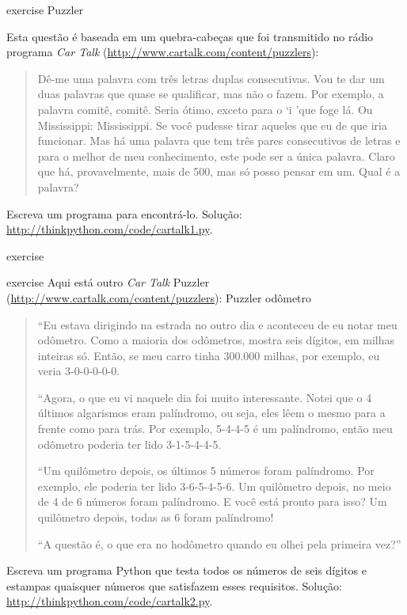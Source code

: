 \documentclass[10pt]{book}
\begin{document}
\begin{exercise}
\begin{} exercise
\index{} Puzzler

Esta questão é baseada em um quebra-cabeças que foi transmitido no rádio
programa {\em Car Talk} 
(\url{http://www.cartalk.com/content/puzzlers}):

\begin{quote}
Dê-me uma palavra com três letras duplas consecutivas. Vou te dar um
duas palavras que quase se qualificar, mas não o fazem. Por exemplo, a palavra
comitê, comitê. Seria ótimo, exceto para o `i 'que
foge lá. Ou Mississippi: Mississippi. Se você pudesse
tirar aqueles que eu de que iria funcionar. Mas há uma palavra que tem três
pares consecutivos de letras e para o melhor de meu conhecimento, este pode
ser a única palavra. Claro que há, provavelmente, mais de 500, mas só posso
pensar em um. Qual é a palavra?
\end{quote}

Escreva um programa para encontrá-lo. Solução: \url{http://thinkpython.com/code/cartalk1.py}.

\end{} exercise


\begin{} exercise
Aqui está outro {\em Car Talk}
Puzzler (\url{http://www.cartalk.com/content/puzzlers}):
\index{} Puzzler
\index{} odômetro

\begin{quote}
``Eu estava dirigindo na estrada no outro dia e aconteceu de eu
notar meu odômetro. Como a maioria dos odômetros, mostra seis dígitos,
em milhas inteiras só. Então, se meu carro tinha 300.000
milhas, por exemplo, eu veria 3-0-0-0-0-0.

``Agora, o que eu vi naquele dia foi muito interessante. Notei que o
4 últimos algarismos eram palíndromo, ou seja, eles lêem o mesmo para a frente como
para trás. Por exemplo, 5-4-4-5 é um palíndromo, então meu odômetro
poderia ter lido 3-1-5-4-4-5.

``Um quilômetro depois, os últimos 5 números foram palíndromo. Por exemplo, ele
poderia ter lido 3-6-5-4-5-6. Um quilômetro depois, no meio de 4 de
6 números foram palíndromo. E você está pronto para isso? Um quilômetro depois,
todas as 6 foram palíndromo!

``A questão é, o que era no hodômetro quando eu olhei pela primeira vez?''
\end{quote}

Escreva um programa Python que testa todos os números de seis dígitos e estampas
quaisquer números que satisfazem esses requisitos.  
Solução: \url{http://thinkpython.com/code/cartalk2.py}.


\end{}
\end{exercise}
\end{document}
